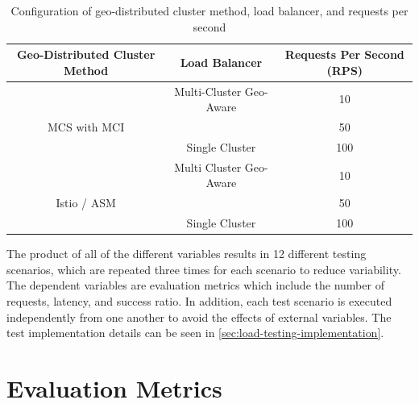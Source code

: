 
\begin{table}
\centering
\caption{Configuration of geo-distributed cluster method, load balancer, and requests per second}
\begin{tabular}{|c|c|c|}
\hline
Geo-Distributed Cluster Method & Load Balancer & Requests Per Second (RPS) \\ \hline
& Multi-Cluster Geo-Aware & 10 \\ \cline{3-3}
MCS with MCI & & 50 \\ \cline{3-3}
& Single Cluster & 100 \\ \hline
& Multi Cluster Geo-Aware & 10 \\ \cline{3-3}
Istio / ASM & & 50 \\ \cline{3-3}
& Single Cluster & 100 \\ \hline
\end{tabular}
\label{table:combined-config}
\end{table}

The product of all of the different variables results in 12 different testing scenarios, which are repeated three times for each scenario to reduce variability. The dependent variables are evaluation metrics which include the number of requests, latency, and success ratio. In addition, each test scenario is executed independently from one another to avoid the effects of external variables. The test implementation details can be seen in \autoref{sec:load-testing-implementation}.

\section{Evaluation Metrics}
\label{sec:evaluationMetrics}

